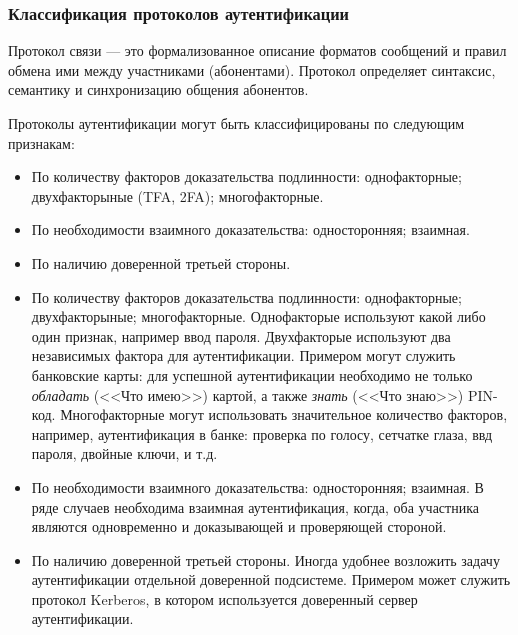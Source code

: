 \begin{frame}
\frametitle{Классификация протоколов аутентификации}
\begin{definition}%
\alert{Протокол связи} --- это формализованное описание форматов сообщений и правил обмена ими между участниками (абонентами). Протокол определяет \alert{синтаксис}, \alert{семантику} и \alert{синхронизацию} общения абонентов.
\end{definition}

Протоколы аутентификации могут быть классифицированы по следующим признакам:
\begin{itemize}
    \item По количеству факторов доказательства подлинности: однофакторные; двухфакторыные (TFA, 2FA); многофакторные.
    \item По необходимости взаимного доказательства: односторонняя; взаимная.
    \item По наличию доверенной третьей стороны.
\end{itemize}
\end{frame}


\begin{itemize}
    \item По количеству факторов доказательства подлинности: однофакторные; двухфакторыные; многофакторные. Однофакторые используют какой либо один признак, например ввод пароля. Двухфакторые используют два независимых фактора для аутентификации. Примером могут служить банковские карты: для успешной аутентификации необходимо не только \emph{обладать} (<<Что имею>>) картой, а также \emph{знать} (<<Что знаю>>) PIN-код. Многофакторные могут использовать значительное количество факторов, например, аутентификация в банке: проверка по голосу, сетчатке глаза, ввд пароля, двойные ключи, и т.д.
    \item По необходимости взаимного доказательства: односторонняя; взаимная. В ряде случаев необходима взаимная аутентификация, когда, оба участника являются одновременно и доказывающей и проверяющей стороной.
    \item По наличию доверенной третьей стороны. Иногда удобнее возложить задачу аутентификации отдельной доверенной подсистеме. Примером может служить протокол Kerberos, в котором используется доверенный сервер аутентификации.
\end{itemize}


